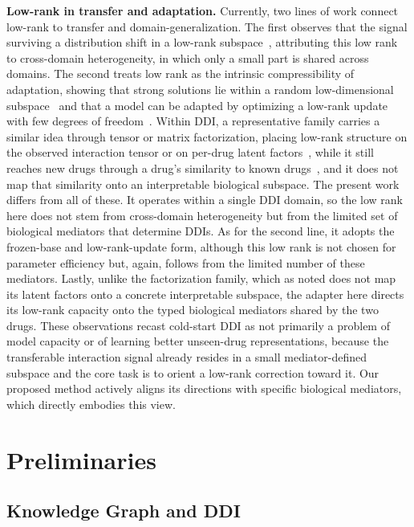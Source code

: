 \documentclass[letterpaper]{article} %
\begin{document}
\textbf{Low-rank in transfer and adaptation.} 
Currently, two lines of work connect low-rank to transfer and domain-generalization.
%
The first observes that the signal surviving a distribution shift in a low-rank subspace~\cite{LTS-ICDM-2012,DEEPDG-ITIP-2017,ISR-ICML-2022}, attributing this low rank to cross-domain heterogeneity, in which only a small part is shared across domains.
%
The second treats low rank as the intrinsic compressibility of adaptation, showing that strong solutions lie within a random low-dimensional subspace~\cite{INTRINSICDIM-ICLR-2018} and that a model can be adapted by optimizing a low-rank update with few degrees of freedom~\cite{Lora-ICLR-2022}.
%
Within DDI, a representative family carries a similar idea through tensor or matrix factorization, placing low-rank structure on the observed interaction tensor or on per-drug latent factors~\cite{Method-Decagon,Method-CTF_ddi}, while it still reaches new drugs through a drug's similarity to known drugs~\cite{Method-TMFUF}, and it does not map that similarity onto an interpretable biological subspace.
%
The present work differs from all of these. It operates within a single DDI domain, so the low rank here does not stem from cross-domain heterogeneity but from the limited set of biological mediators that determine DDIs. 
%
As for the second line, it adopts the frozen-base and low-rank-update form, although this low rank is not chosen for parameter efficiency but, again, follows from the limited number of these mediators.
%
Lastly, unlike the factorization family, which as noted does not map its latent factors onto a concrete interpretable subspace, the adapter here directs its low-rank capacity onto the typed biological mediators shared by the two drugs.
%
These observations recast cold-start DDI as not primarily a problem of model capacity or of learning better unseen-drug representations, because the transferable interaction signal already resides in a small mediator-defined subspace and the core task is to orient a low-rank correction toward it.
%
Our proposed method actively aligns its directions with specific biological mediators, which directly embodies this view.

\section{Preliminaries}
\subsection{Knowledge Graph and DDI}
\end{document}
